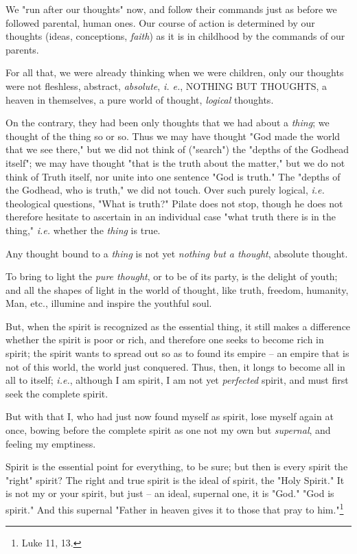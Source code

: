 \documentclass[a4paper]{book}
\begin{document}
We "{}run after our thoughts"{} now, and follow their commands just as before 
we followed parental, human ones. Our course of action is determined by our 
thoughts (ideas, conceptions, \textit{faith}) as it is in childhood by the 
commands of our parents.

For all that, we were already thinking when we were children, only our 
thoughts were not fleshless, abstract, \textit{absolute}, \textit{i. e.}, 
NOTHING BUT THOUGHTS, a heaven in themselves, a pure world of thought, 
\textit{logical} thoughts.

On the contrary, they had been only thoughts that we had about a 
\textit{thing}; we thought of the thing so or so. Thus we may have thought 
"{}God made the world that we see there,"{} but we did not think of 
("{}search"{}) the "{}depths of the Godhead itself"{}; we may have thought 
"{}that is the truth about the matter,"{} but we do not think of Truth itself, 
nor unite into one sentence "{}God is truth."{} The "{}depths of the Godhead, 
who is truth,"{} we did not touch. Over such purely logical, \textit{i.e.} 
theological questions, "{}What is truth?"{} Pilate does not stop, though he 
does not therefore hesitate to ascertain in an individual case "{}what truth 
there is in the thing,"{} \textit{i.e.} whether the \textit{thing} is true.

Any thought bound to a \textit{thing} is not yet \textit{nothing but a 
thought}, absolute thought.

To bring to light the \textit{pure thought}, or to be of its party, is the 
delight of youth; and all the shapes of light in the world of thought, like 
truth, freedom, humanity, Man, etc., illumine and inspire the youthful soul.

But, when the spirit is recognized as the essential thing, it still makes a 
difference whether the spirit is poor or rich, and therefore one seeks to 
become rich in spirit; the spirit wants to spread out so as to found its 
empire -- an empire that is not of this world, the world just conquered. Thus, 
then, it longs to become all in all to itself; \textit{i.e.}, although I am 
spirit, I am not yet \textit{perfected} spirit, and must first seek the 
complete spirit.

But with that I, who had just now found myself as spirit, lose myself again at 
once, bowing before the complete spirit as one not my own but 
\textit{supernal}, and feeling my emptiness.

Spirit is the essential point for everything, to be sure; but then is every 
spirit the "{}right"{} spirit? The right and true spirit is the ideal of 
spirit, the "{}Holy Spirit."{} It is not my or your spirit, but just -- an 
ideal, supernal one, it is "{}God."{} "{}God is spirit."{} And this supernal 
"{}Father in heaven gives it to those that pray to him."{}\footnote{Luke 11, 
13.}
\end{document}
